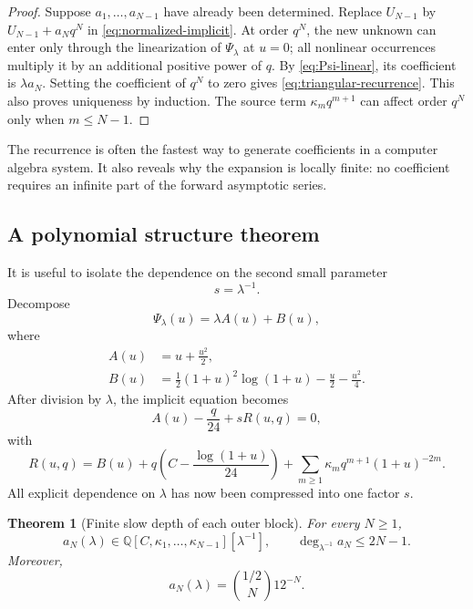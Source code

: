 \documentclass[11pt,oneside]{article}
\theoremstyle{plain}
\newtheorem{theorem}{Theorem}[section]
\theoremstyle{definition}
\theoremstyle{remark}
\newcommand{\Q}{\mathbb{Q}}
\begin{document}
\begin{proof}
Suppose \(a_1,\ldots,a_{N-1}\) have already been determined.  Replace
\(U_{N-1}\) by \(U_{N-1}+a_Nq^N\) in \cref{eq:normalized-implicit}.  At order
\(q^N\), the new unknown can enter only through the linearization of
\(\Psi_\lambda\) at \(u=0\); all nonlinear occurrences multiply it by an
additional positive power of \(q\).  By \cref{eq:Psi-linear}, its coefficient
is \(\lambda a_N\).  Setting the coefficient of \(q^N\) to zero gives
\cref{eq:triangular-recurrence}.  This also proves uniqueness by induction.
The source term \(\kappa_mq^{m+1}\) can affect order \(q^N\) only when
\(m\le N-1\).
\end{proof}

The recurrence is often the fastest way to generate coefficients in a computer
algebra system.  It also reveals why the expansion is locally finite: no
coefficient requires an infinite part of the forward asymptotic series.

\subsection{A polynomial structure theorem}

It is useful to isolate the dependence on the second small parameter
\begin{equation}
 s=\lambda^{-1}.
 \label{eq:s-def}
\end{equation}
Decompose
\begin{equation}
 \Psi_\lambda(u)=\lambda A(u)+B(u),
 \label{eq:Psi-AB}
\end{equation}
where
\begin{align}
 A(u)&=u+\frac{u^2}{2},
 \label{eq:A-def}\\
 B(u)&=\frac12(1+u)^2\log(1+u)-\frac u2-\frac{u^2}{4}.
 \label{eq:B-def}
\end{align}
After division by \(\lambda\), the implicit equation becomes
\begin{equation}
 A(u)-\frac q{24}+sR(u,q)=0,
 \label{eq:s-implicit}
\end{equation}
with
\begin{equation}
 R(u,q)=B(u)+q\left(C-\frac{\log(1+u)}{24}\right)
 +\sum_{m\ge1}\kappa_mq^{m+1}(1+u)^{-2m}.
 \label{eq:R-def}
\end{equation}
All explicit dependence on \(\lambda\) has now been compressed into one factor
\(s\).

\begin{theorem}[Finite slow depth of each outer block]
\label{thm:finite-slow-depth}
For every \(N\ge1\),
\begin{equation}
 a_N(\lambda)
 \in\Q[C,\kappa_1,\ldots,\kappa_{N-1}][\lambda^{-1}],
 \qquad
 \deg_{\lambda^{-1}}a_N\le2N-1.
 \label{eq:aN-ring}
\end{equation}
Moreover,
\begin{equation}
 [\lambda^0]a_N(\lambda)
 =\binom{1/2}{N}12^{-N}.
 \label{eq:aN-constant-term}
\end{equation}
\end{theorem}
\end{document}

